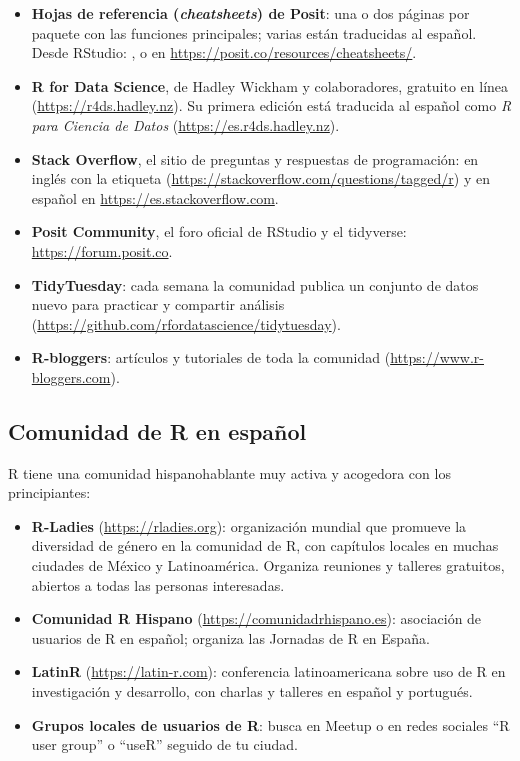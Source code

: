 \begin{itemize}
  \item \textbf{Hojas de referencia (\textit{cheatsheets}) de Posit}: una o
        dos páginas por paquete con las funciones principales; varias están
        traducidas al español. Desde RStudio: , o
        en \url{https://posit.co/resources/cheatsheets/}.
  \item \textbf{R for Data Science}, de Hadley Wickham y colaboradores,
        gratuito en línea (\url{https://r4ds.hadley.nz}). Su primera
        edición está traducida al español como \textit{R para Ciencia de
        Datos} (\url{https://es.r4ds.hadley.nz}).
  \item \textbf{Stack Overflow}, el sitio de preguntas y respuestas de
        programación: en inglés con la etiqueta 
        (\url{https://stackoverflow.com/questions/tagged/r}) y en español
        en \url{https://es.stackoverflow.com}.
  \item \textbf{Posit Community}, el foro oficial de RStudio y el
        tidyverse: \url{https://forum.posit.co}.
  \item \textbf{TidyTuesday}: cada semana la comunidad publica un conjunto
        de datos nuevo para practicar y compartir análisis
        (\url{https://github.com/rfordatascience/tidytuesday}).
  \item \textbf{R-bloggers}: artículos y tutoriales de toda la comunidad
        (\url{https://www.r-bloggers.com}).
\end{itemize}

\subsection{Comunidad de R en español}

R tiene una comunidad hispanohablante muy activa y acogedora con los
principiantes:

\begin{itemize}
  \item \textbf{R-Ladies} (\url{https://rladies.org}): organización mundial
        que promueve la diversidad de género en la comunidad de R, con
        capítulos locales en muchas ciudades de México y Latinoamérica.
        Organiza reuniones y talleres gratuitos, abiertos a todas las
        personas interesadas.
  \item \textbf{Comunidad R Hispano} (\url{https://comunidadrhispano.es}):
        asociación de usuarios de R en español; organiza las Jornadas de R
        en España.
  \item \textbf{LatinR} (\url{https://latin-r.com}): conferencia
        latinoamericana sobre uso de R en investigación y desarrollo, con
        charlas y talleres en español y portugués.
  \item \textbf{Grupos locales de usuarios de R}: busca en Meetup o en
        redes sociales ``R user group'' o ``useR'' seguido de tu ciudad.
\end{itemize}

